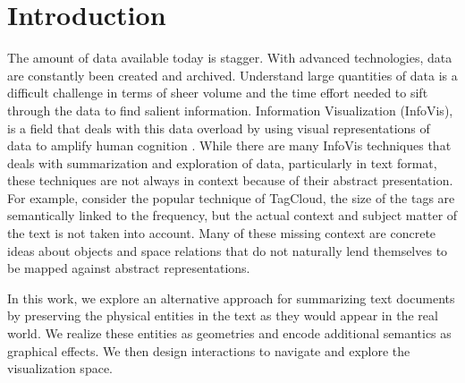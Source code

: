 \chapter{Introduction}
The amount of data available today is stagger. With advanced technologies, data
are constantly been created and archived. Understand large quantities of data is
a difficult challenge in terms of sheer volume and the time effort needed to
sift through the data to find salient information. Information Visualization
(InfoVis), is a field that deals with this data overload by using visual
representations of data to amplify human cognition \cite{Card1999}. While there
are many InfoVis techniques that deals with summarization and exploration of
data, particularly in text format, these techniques are not always in context
because of their abstract presentation. For example, consider the popular
technique of TagCloud, the size of the tags are semantically linked to the
frequency, but the actual context and subject matter of the text is not taken
into account. Many of these missing context are concrete ideas about objects and
space relations that do not naturally lend themselves to be mapped against
abstract representations.
 
In this work, we explore an alternative approach for summarizing text documents
by preserving the physical entities in the text as they would appear in the real
world. We realize these entities as \threed geometries and encode additional
semantics as graphical effects. We then design interactions to navigate and
explore the \threed visualization space.

 
